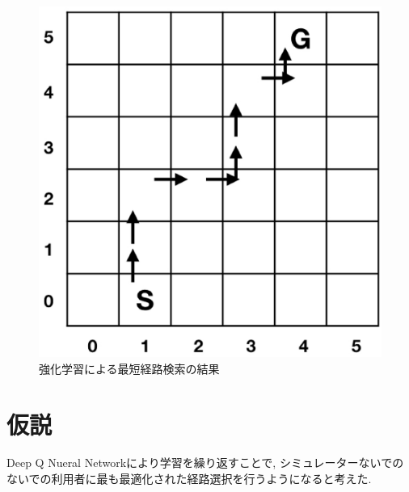 \begin{figure}[H]
    \centering  %
    \includegraphics[clip,width = 13.0cm]{assets/rein_simple.eps}
    \caption{強化学習による最短経路検索の結果}  \label{sample}
\end{figure}
  





\section{仮説}

Deep Q Nueral Networkにより学習を繰り返すことで, シミュレーターないでのないでの利用者に最も最適化された経路選択を行うようになると考えた.


